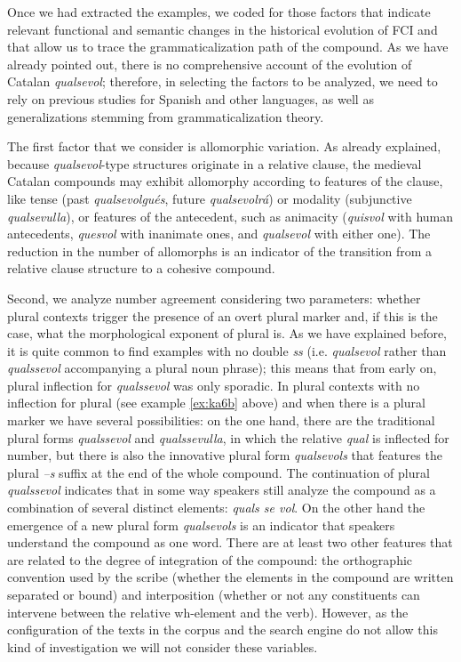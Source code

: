 \documentclass[output=paper,colorlinks,citecolor=brown]{langscibook}
\begin{document}
Once we had extracted the examples, we coded for those factors that indicate relevant functional and semantic changes in the historical evolution of FCI and that allow us to trace the grammaticalization path of the compound. As we have already pointed out, there is no comprehensive account of the evolution of Catalan \textit{qualsevol};  therefore, in selecting the factors to be analyzed, we need to rely on previous studies for Spanish and other languages, as well as generalizations stemming from grammaticalization theory.

The first factor that we consider is allomorphic variation. As already explained, because \textit{qualsevol}-type structures originate in a relative clause, the medieval Catalan compounds may exhibit allomorphy  according to features of the clause, like tense (past \textit{qualsevolgués}, future \textit{qualsevolrá}) or modality (subjunctive \textit{qualsevulla}), or features of the antecedent, such as animacity (\textit{quisvol} with human antecedents, \textit{quesvol} with inanimate ones, and \textit{qualsevol} with either one). The reduction in the number of allomorphs is an indicator of the transition from a relative clause structure to a cohesive compound.

Second, we analyze number agreement considering two parameters: whether plural contexts trigger the presence of an overt plural marker and, if this is the case, what the morphological exponent of plural is. As we have explained before, it is quite common to find examples with no double \textit{ss} (i.e. \textit{qualsevol} rather than \textit{qualssevol} accompanying a plural noun phrase); this means that from early on, plural inflection for \textit{qualssevol} was only sporadic. In plural contexts with no inflection for plural (see example \ref{ex:ka6b} above) and when there is a plural marker we have several possibilities: on the one hand, there are the traditional plural forms \textit{qualssevol} and \textit{qualssevulla}, in which the relative \textit{qual} is inflected for number, but there is also the innovative plural form \textit{qualsevols} that features the plural \textit{–s} suffix at the end of the whole compound. The continuation of plural \textit{qualssevol} indicates that in some way speakers still analyze the compound as a combination of several distinct elements: \textit{quals se vol}. On the other hand the emergence of a new plural form \textit{qualsevols} is an indicator that speakers understand the compound as one word. There are at least two other features that are related to the degree of integration of the compound: the orthographic convention used by the scribe (whether the elements in the compound are written separated or bound) and interposition (whether or not any constituents can intervene between the relative wh-element and the verb). However, as the configuration of the texts in the corpus and the search engine do not allow this kind of investigation we will not consider these variables.
\end{document}
